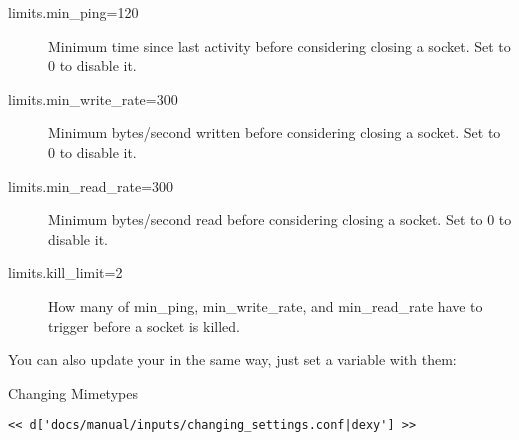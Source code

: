 \begin{description}
\item[limits.min\_ping=120] Minimum time since last activity before considering closing a socket.  Set to 0 to disable it.
\item[limits.min\_write\_rate=300] Minimum bytes/second written before considering closing a socket. Set to 0 to disable it.
\item[limits.min\_read\_rate=300] Minimum bytes/second read before considering closing a socket. Set to 0 to disable it.
\item[limits.kill\_limit=2] How many of min\_ping, min\_write\_rate, and min\_read\_rate have to trigger before a socket is killed.
\end{description}


You can also update your  in the same way, just set a variable with them:

\begin{code}{Changing Mimetypes}
\begin{lstlisting}
<< d['docs/manual/inputs/changing_settings.conf|dexy'] >>
\end{lstlisting}
\end{code}

